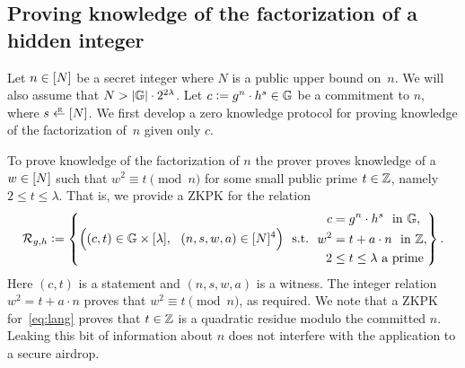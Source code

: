 \documentclass[11pt]{article}
\begin{document}
\subsection{Proving knowledge of the factorization of a hidden integer}

Let $n \in [{N}]$ be a secret integer 
where $N$ is a public upper bound on~$n$.
We will also assume that $N > \lvert \mathbb G \rvert \cdot 2^{2 \lambda}$.
Let $c \mathrel{\mathop:}= g^n \cdot h^s \in \mathbb G$ be a commitment to $n$, 
where $s \rgets \range{N}$.  
We first develop a zero knowledge protocol for proving knowledge of the
factorization of~$n$ given only $c$. 


To prove knowledge of the factorization of $n$ the prover
proves knowledge of a $w \in [{N}]$ such that $w^2 \equiv t \pmod{n}$
for some small public prime $t \in \mathbb Z$, namely $2 \leq t \leq \lambda$.
That is, we provide a ZKPK for the relation
\begin{equation} \label{eq:lang}
  {\cal R}_{g,h} \deq \left\{ \Bigl( (c, t) \in \GG \times \range{\lambda},\ \ 
                              (n, s, w, a) \in \range{N}^4 \Bigr)  \ \ 
        \text{s.t.}\ \ 
                \begin{split}
                        c   & = g^n \cdot h^s \ \ \text{in $\GG$}, \\
                        w^2 & = t + a \cdot n \ \ \text{in $\ZZ$}, \\
                        2 & \leq t \leq \lambda  \ \textrm{a prime}
                \end{split}  \right\}.
\end{equation}
Here $(c, t)$ is a statement and $(n, s, w, a)$ is a witness.
The integer relation $w^2 = t + a\cdot n$ proves that 
$w^2 \equiv t \pmod{n}$, as required.
We note that a ZKPK for~\eqref{eq:lang} proves that $t \in \mathbb Z$ is a quadratic
residue modulo the committed $n$.  Leaking this bit of information about $n$
does not interfere with the application to a secure airdrop.
\end{document}
